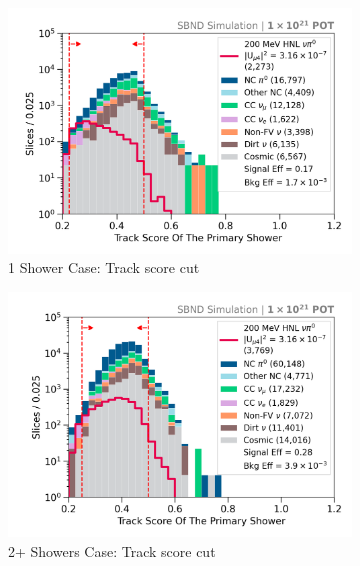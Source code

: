 \begin{figure}[b!]
        \begin{subfigure}[b]{0.495\textwidth}   
            \centering 
            \includegraphics[width=\textwidth]{one_shw_track_score}
            \caption{1 Shower Case: Track score cut}%
        \end{subfigure}
        \hfill
        \begin{subfigure}[b]{0.495\textwidth}   
            \centering 
            \includegraphics[width=\textwidth]{two_shower_primary_track_score_precut}
            \caption{2+ Showers Case: Track score cut}%
        \end{subfigure}
        \hfill
	\centering
        \begin{subfigure}[b]{0.495\textwidth}   
            \centering 

\end{subfigure}
\end{figure}
